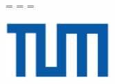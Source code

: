 \begin{titlepage}
  \oddsidemargin=\evensidemargin\relax
  \textwidth=\dimexpr{}\evensidemargin-2in\relax
  \hsize=\textwidth\relax

  \centering

  \includegraphics[width=40mm]{logos/tum}


  \vspace{5mm}
  {\huge\MakeUppercase{\getUniversity{}}}\\
  
  \vspace{10mm}
  {\large\MakeUppercase{\getGroup{}}}\\

  \vspace{15mm}
  {\Large \getDoctype{}}

  \vspace{15mm}
  {\huge\bfseries \getTitleGer{}}

  \vspace{15mm}
  {\LARGE \getAuthor{}}

  \vspace{20mm}
  
\end{titlepage}
